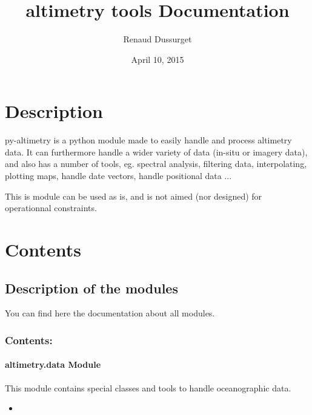 \documentclass[letterpaper,10pt,english]{sphinxmanual}
\title{altimetry tools Documentation}
\date{April 10, 2015}
\author{Renaud Dussurget}
\begin{document}
\maketitle
\tableofcontents
{}\label{index::doc}



\chapter{Description}
\label{index:description}\label{index:welcome-to-altimetry-tools-s-documentation}
py-altimetry is a python module made to easily handle and process altimetry data.
It can furthermore handle a wider variety of data (in-situ or imagery data), and also has a number of tools, eg. spectral analysis, filtering data, interpolating, plotting maps, handle date vectors, handle positional data ...

This is module can be used as is, and is not aimed (nor designed) for operationnal constraints.


\chapter{Contents}
\label{index:contents}

\section{Description of the modules}
\label{Modules:description-of-the-modules}\label{Modules::doc}
You can find here the documentation about all modules.


\subsection{Contents:}
\label{Modules:contents}

\subsubsection{altimetry.data Module}
\label{altimetry.data:altimetry-data-module}\label{altimetry.data::doc}
This module contains special classes and tools to handle oceanographic data.
\begin{itemize}\setlength{\itemsep}{0pt}\setlength{\parskip}{0pt}
\item {} 

\end{itemize}
\end{document}
